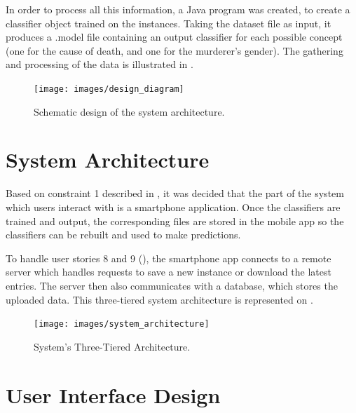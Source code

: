 \documentclass{mproj}
\begin{document}
In order to process all this information, a Java program was created, to create a classifier object trained on the instances. Taking the dataset file as input, it produces a .model file containing an output classifier for each possible concept (one for the cause of death, and one for the murderer's gender). The gathering and processing of the data is illustrated in .

\begin{figure}[h]
	\centering
	\texttt{[image: images/design\_diagram]}
	\caption{Schematic design of the system architecture.}
	\label{fig:design}
\end{figure}

\section{System Architecture}

Based on constraint 1 described in , it was decided that the part of the system which users interact with is a smartphone application. Once the classifiers are trained and output, the corresponding files are stored in the mobile app so the classifiers can be rebuilt and used to make predictions.\par

To handle user stories 8 and 9 (), the smartphone app connects to a remote server which handles requests to save a new instance or download the latest entries. The server then also communicates with a database, which stores the uploaded data. This three-tiered system architecture is represented on .

\begin{figure}[h]
	\centering
	\texttt{[image: images/system\_architecture]}
	\caption{System's Three-Tiered Architecture.}
	\label{fig:architecture}
\end{figure}

\section{User Interface Design}\label{wireframes}
\end{document}
